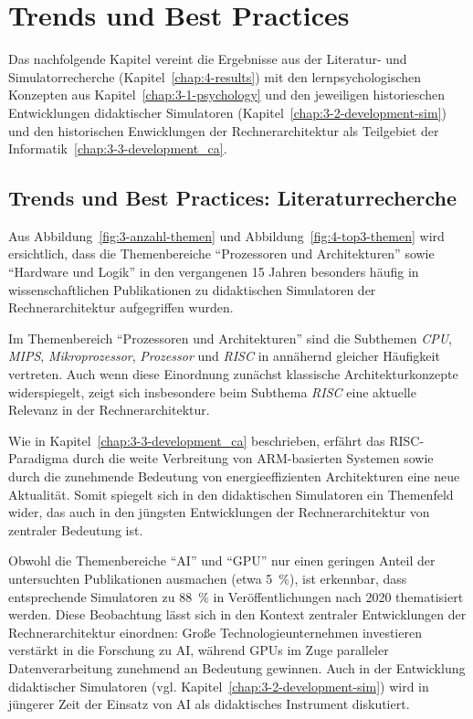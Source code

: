 \section{Trends und Best Practices}

Das nachfolgende Kapitel vereint die Ergebnisse aus der Literatur- und Simulatorrecherche (Kapitel~\ref{chap:4-results}) mit den lernpsychologischen Konzepten aus Kapitel~\ref{chap:3-1-psychology} und den jeweiligen historieschen Entwicklungen didaktischer Simulatoren (Kapitel~\ref{chap:3-2-development-sim}) und den historischen Enwicklungen der Rechnerarchitektur als Teilgebiet der Informatik~\ref{chap:3-3-development_ca}.

\subsection{Trends und Best Practices: Literaturrecherche}

Aus Abbildung~\ref{fig:3-anzahl-themen} und Abbildung~\ref{fig:4-top3-themen} wird ersichtlich, dass die Themenbereiche \enquote{Prozessoren und Architekturen} sowie \enquote{Hardware und Logik} in den vergangenen 15 Jahren besonders häufig in wissenschaftlichen Publikationen zu didaktischen Simulatoren der Rechnerarchitektur aufgegriffen wurden.  

Im Themenbereich \enquote{Prozessoren und Architekturen} sind die Subthemen \textit{CPU}, \textit{MIPS}, \textit{Mikroprozessor}, \textit{Prozessor} und \textit{RISC} in annähernd gleicher Häufigkeit vertreten. Auch wenn diese Einordnung zunächst klassische Architekturkonzepte widerspiegelt, zeigt sich insbesondere beim Subthema \textit{RISC} eine aktuelle Relevanz in der Rechnerarchitektur.  

Wie in Kapitel~\ref{chap:3-3-development_ca} beschrieben, erfährt das \ac{RISC}-Paradigma durch die weite Verbreitung von ARM-basierten Systemen sowie durch die zunehmende Bedeutung von energieeffizienten Architekturen eine neue Aktualität. Somit spiegelt sich in den didaktischen Simulatoren ein Themenfeld wider, das auch in den jüngsten Entwicklungen der Rechnerarchitektur von zentraler Bedeutung ist.

Obwohl die Themenbereiche \enquote{AI} und \enquote{GPU} nur einen geringen Anteil der untersuchten Publikationen ausmachen (etwa 5~\%), ist erkennbar, dass entsprechende Simulatoren zu 88~\% in Veröffentlichungen nach 2020 thematisiert werden. Diese Beobachtung lässt sich in den Kontext zentraler Entwicklungen der Rechnerarchitektur einordnen: Große Technologieunternehmen investieren verstärkt in die Forschung zu \ac{AI}, während GPUs im Zuge paralleler Datenverarbeitung zunehmend an Bedeutung gewinnen. Auch in der Entwicklung didaktischer Simulatoren (vgl. Kapitel~\ref{chap:3-2-development-sim}) wird in jüngerer Zeit der Einsatz von \ac{AI} als didaktisches Instrument diskutiert.


